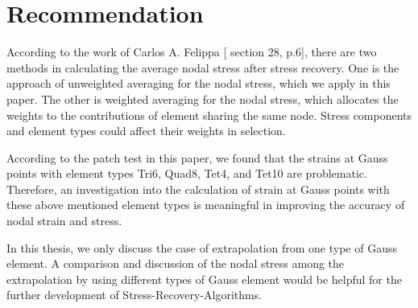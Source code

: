 \section{Recommendation}
According to the work of Carlos A. Felippa [\cite{Felippa} section 28, p.6], there are two methods in calculating the average nodal stress after stress recovery. One is the approach of unweighted averaging for the nodal stress, which we apply in this paper. The other is weighted averaging for the nodal stress, which allocates the weights to the contributions of element sharing the same node. Stress components and element types could affect their weights in selection.

According to the patch test in this paper, we found that the strains at Gauss points with element types Tri6, Quad8, Tet4, and Tet10 are problematic. Therefore, an investigation into the calculation of strain at Gauss points with these above mentioned element types is meaningful in improving the accuracy of nodal strain and stress. 

 In this thesis, we only discuss the case of extrapolation from one type of Gauss element. A comparison and discussion of the nodal stress among the extrapolation by using different types of Gauss element would be helpful for the further development of Stress-Recovery-Algorithms. 
